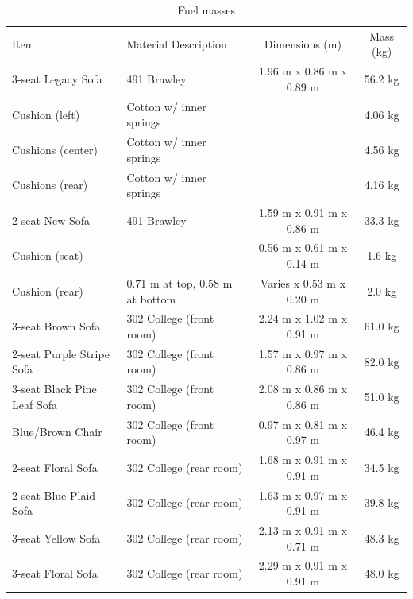 \documentclass[12pt,oneside]{book}
\begin{document}
\begin{table}
	\centering
	\caption{Fuel masses}
	\begin{tabular}{llcc}
		\hline\noalign{\smallskip}
		Item                         &  Material Description             &  Dimensions (m)            &  Mass (kg)  \\
		\noalign{\smallskip}\hline\noalign{\smallskip}
		3-seat Legacy Sofa         &  491 Brawley                      &  1.96 m x 0.86 m x 0.89 m  &  56.2 kg    \\
		Cushion (left)           &  Cotton w/ inner springs          &                            &  4.06 kg    \\
		Cushions (center)        &  Cotton w/ inner springs          &                            &  4.56 kg    \\
		Cushions (rear)          &  Cotton w/ inner springs          &                            &  4.16 kg    \\
		2-seat New Sofa            &  491 Brawley                      &  1.59 m x 0.91 m x 0.86 m  &  33.3 kg    \\
		Cushion (seat)           &                                   &  0.56 m x 0.61 m x 0.14 m  &  1.6 kg     \\
		Cushion (rear)           &  0.71 m at top, 0.58 m at bottom  &  Varies x 0.53 m x 0.20 m  &  2.0 kg     \\
		3-seat Brown Sofa            &  302 College (front room)         &  2.24 m x 1.02 m x 0.91 m  &  61.0 kg    \\
		2-seat Purple Stripe Sofa    &  302 College (front room)         &  1.57 m x 0.97 m x 0.86 m  &  82.0 kg    \\
		3-seat Black Pine Leaf Sofa  &  302 College (front room)         &  2.08 m x 0.86 m x 0.86 m  &  51.0 kg    \\
		Blue/Brown Chair             &  302 College (front room)         &  0.97 m x 0.81 m x 0.97 m  &  46.4 kg    \\
		2-seat Floral Sofa           &  302 College (rear room)          &  1.68 m x 0.91 m x 0.91 m  &  34.5 kg    \\
		2-seat Blue Plaid Sofa       &  302 College (rear room)          &  1.63 m x 0.97 m x 0.91 m  &  39.8 kg    \\
		3-seat Yellow Sofa           &  302 College (rear room)          &  2.13 m x 0.91 m x 0.71 m  &  48.3 kg    \\
		3-seat Floral Sofa           &  302 College (rear room)          &  2.29 m x 0.91 m x 0.91 m  &  48.0 kg    \\

\end{tabular}
\end{table}
\end{document}
